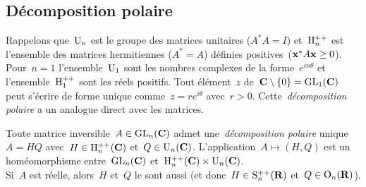 \subsection{Décomposition polaire}

Rappelons que~$\mathrm{U}_n$ est le groupe des matrices unitaires ($A^*A=I$)
et~$\mathrm{H}_n^{++}$ est l'ensemble des matrices hermitiennes ($A^*=A$) définies
positives~($\mathbf{x}^*A\mathbf{x}\ge 0$).  Pour~$n=1$ l'ensemble~$\mathrm{U}_1$ sont les nombres
complexes de la forme~$e^{in\theta}$ et l'ensemble~$\mathrm{H}_1^{++}$ sont les réels
positifs.  Tout élément~$z$ de~$\mathbf{C}\setminus\{0\}=\mathrm{GL}_1(\mathbf{C})$ peut s'écrire de
forme unique comme~$z=re^{i\theta}$ avec~$r>0$.  Cette~\emph{décomposition
polaire} a un analogue direct avec les matrices.

\begin{theorem}
	\label{thm:polaire}
	Toute matrice inversible~$A\in\mathrm{GL}_n(\mathbf{C})$ admet une~\emph{décomposition
	polaire}
	unique~$A=HQ$ avec~$H\in\mathrm{H}_n^{++}(\mathbf{C})$ et~$Q\in\mathrm{U}_n(\mathbf{C})$.
	L'application~$A\mapsto(H,Q)$ est un homéomorphisme entre~$\mathrm{GL}_n(\mathbf{C})$
	et~$\mathrm{H}_n^{++}(\mathbf{C})\times\mathrm{U}_n(\mathbf{C})$.\\
	Si~$A$ est réelle, alors~$H$ et~$Q$ le sont
	aussi (et donc~$H\in\mathrm{S}^{++}_n(\mathbf{R})$ et~$Q\in\mathrm{O}_n(\mathbf{R})$).
\end{theorem}

